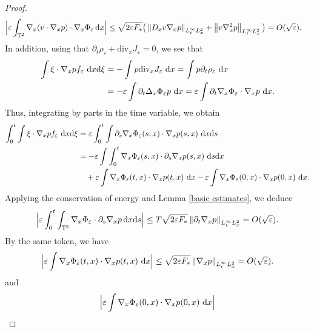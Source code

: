 \documentclass[11pt,reqno]{amsart}
\numberwithin{equation}{section}
\def\dd{{\rm d}}
\begin{document}
\begin{proof}
\begin{align}
\Big|\varepsilon\int_{\mathbb T^{2}}\nabla_x(v\cdot\nabla_xp)\cdot\nabla_x\Phi_\varepsilon\,\dd x\Big|
&\leq \sqrt{2\varepsilon F_*}\big(\left\Vert D_{x}v\nabla_{x}p\right\Vert_{L^{\infty}_{t}L^{2}_{x}}+\left\Vert v\nabla_{x}^{2}p\right\Vert_{L^{\infty}_{t}L^{2}_{x}}\big)
=O(\sqrt\varepsilon). \label{nelligible term 1st}
\end{align}
In addition, using that $\partial_{t}\rho_{\varepsilon}+\mathrm{div}_{x}J_{\varepsilon}=0$, 
we see that  
\begin{align*}
\int \xi \cdot \nabla_{x} pf_{\varepsilon} \ \dd x\dd \xi&=-\int p\mathrm{div}_{x}J_{\varepsilon
}\ \dd x=\int p\partial_{t}\rho_{\varepsilon}\ \dd x\\&=-\varepsilon\int\partial_{t}\Delta_{x} \Phi_{\varepsilon}p\ \dd x=\varepsilon \int \partial_{t}\nabla_{x} \Phi_{\varepsilon}\cdot \nabla_{x} p\ \dd x.     
\end{align*}
Thus, integrating by parts in the time variable, we obtain  
\begin{align}
\int_{0}^{t}\int \xi\cdot \nabla_{x}p f_{\varepsilon}\ \dd x\dd \xi
&=\varepsilon\int_{0}^{t}\int \partial_{s}\nabla_{x}\Phi_{\varepsilon}(s,x)\cdot \nabla_{x} p(s,x)\ \dd x\dd s \notag\\
&=-\varepsilon\int\int_{0}^{t}\nabla_{x} \Phi_{\varepsilon}(s,x)\cdot \partial_{s}\nabla_{x} p(s,x)\ \dd s\dd x \notag\\
&\quad+\varepsilon\int \nabla_{x} \Phi_{\varepsilon}(t,x)\cdot\nabla_{x} p(t,x)\ \dd x-\varepsilon\int \nabla_{x} \Phi_{\varepsilon}(0,x)\cdot \nabla_{x} p(0,x)\ \dd x. \label{integration by parts in time}       
\end{align}
Applying the conservation of energy and Lemma \ref{basic estimates},
we deduce 
\begin{align}
\Big|\varepsilon\int_{0}^{t}\int_{\mathbb T^{2}}\nabla_{x}\Phi_{\varepsilon}\cdot \partial_{s}\nabla_{x}p\,\dd x\dd s\Big|
\leq T\sqrt{2\varepsilon F_*}\left\Vert \partial_{t}\nabla_{x}p\right\Vert_{L^{\infty}_{t}L^{2}_{x}}
=O(\sqrt\varepsilon). \label{square eps est}
\end{align}
By the same token, we have 
\begin{align}
\Big|\varepsilon \int \nabla_{x}\Phi_{\varepsilon}(t,x)\cdot\nabla_{x}p(t,x)\ \dd x\Big|
\leq \sqrt{2\varepsilon F_*}\left\Vert \nabla_{x}p\right\Vert_{L^{\infty}_{t}L^{2}_{x}}=O(\sqrt{\varepsilon}).  \label{square eps est 1}
\end{align}
and 
\begin{align}
\Big|\varepsilon \int \nabla_{x}\Phi_{\varepsilon}(0,x)\cdot \nabla_{x}p(0,x)\ \dd x\Big|

\end{align}
\end{proof}
\end{document}
